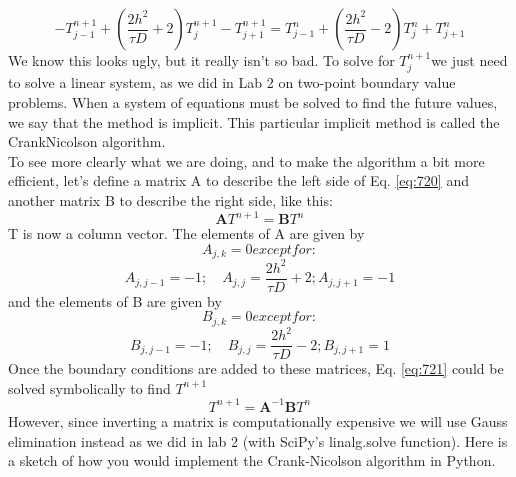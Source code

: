 \begin{equation}\label{eq:720}
-T_{j-1}^{n+1}+\left(\frac{2 h^{2}}{\tau D}+2\right) T_{j}^{n+1}-T_{j+1}^{n+1}=T_{j-1}^{n}+\left(\frac{2 h^{2}}{\tau D}-2\right) T_{j}^{n}+T_{j+1}^{n}
\end{equation}
We know this looks ugly, but it really isn\rq t so bad. To solve for $T^{n+1}_j$we just need to
solve a linear system, as we did in Lab 2 on two-point boundary value problems.
When a system of equations must be solved to find the future values, we say
that the method is implicit. This particular implicit method is called the CrankNicolson algorithm. \\ 
To see more clearly what we are doing, and to make the algorithm a bit more
efficient, let\rq s define a matrix A to describe the left side of Eq. \ref{eq:720} and another
matrix B to describe the right side, like this:
\begin{equation}\label{eq:721}
\mathbf{A} T^{n+1}=\mathbf{B} T^{n}
\end{equation}
T is now a column vector. The elements of A are given by\\
\begin{equation*}
A_{j, k}=0 except for : 
\end{equation*}
\begin{equation}\label{eq:722}
A_{j, j-1}=-1 ; \quad A_{j, j}=\frac{2 h^{2}}{\tau D}+2 ; A_{j, j+1}=-1
\end{equation}
and the elements of B are given by
\begin{equation*}
B_{j, k}=0 except for : 
\end{equation*}
\begin{equation}\label{eq:723}
B_{j, j-1}=-1 ; \quad B_{j, j}=\frac{2 h^{2}}{\tau D}-2 ; B_{j, j+1}=1
\end{equation}
Once the boundary conditions are added to these matrices, Eq. \ref{eq:721} could be
solved symbolically to find $T^{n+1}$
\begin{equation}\label{eq:724}
T^{n+1}=\mathbf{A}^{-1} \mathbf{B} T^{n}
\end{equation}
However, since inverting a matrix is computationally expensive we will use Gauss
elimination instead as we did in lab 2 (with SciPy\rq s linalg.solve function). Here
is a sketch of how you would implement the Crank-Nicolson algorithm in Python.
